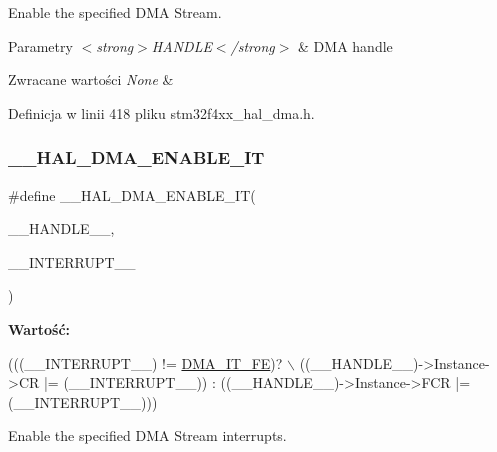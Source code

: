 Enable the specified D\+MA Stream. 


\begin{DoxyParams}{Parametry}
{\em $<$strong$>$\+H\+A\+N\+D\+L\+E$<$/strong$>$} & D\+MA handle \\
\hline
\end{DoxyParams}

\begin{DoxyRetVals}{Zwracane wartości}
{\em None} & \\
\hline
\end{DoxyRetVals}


Definicja w linii 418 pliku stm32f4xx\+\_\+hal\+\_\+dma.\+h.

\mbox{\label{group___d_m_a_ga2124233229c04ca90b790cd8cddfa98b}} 
\subsubsection{\texorpdfstring{\+\_\+\+\_\+\+H\+A\+L\+\_\+\+D\+M\+A\+\_\+\+E\+N\+A\+B\+L\+E\+\_\+\+IT}{\_\_HAL\_DMA\_ENABLE\_IT}}
{\footnotesize\ttfamily \#define \+\_\+\+\_\+\+H\+A\+L\+\_\+\+D\+M\+A\+\_\+\+E\+N\+A\+B\+L\+E\+\_\+\+IT(\begin{DoxyParamCaption}\item[{}]{\+\_\+\+\_\+\+H\+A\+N\+D\+L\+E\+\_\+\+\_\+,  }\item[{}]{\+\_\+\+\_\+\+I\+N\+T\+E\+R\+R\+U\+P\+T\+\_\+\+\_\+ }\end{DoxyParamCaption})}

{\bfseries Wartość\+:}
\begin{DoxyCode}
(((\_\_INTERRUPT\_\_) != \hyperlink{group___d_m_a__interrupt__enable__definitions_ga93164ec039fc5579662c382e68d7d13f}{DMA\_IT\_FE})? \(\backslash\)
((\_\_HANDLE\_\_)->Instance->CR |= (\_\_INTERRUPT\_\_)) : ((\_\_HANDLE\_\_)->Instance->FCR |= (\_\_INTERRUPT\_\_)))
\end{DoxyCode}


Enable the specified D\+MA Stream interrupts. 



